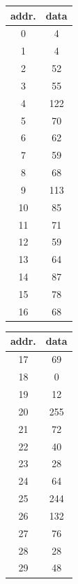 \documentclass{article}
\begin{document}
\begin{figure}[ht]
    \hspace{-10pt}
    \begin{minipage}[c]{.35\linewidth}
        \centering
        \begin{tabular}{c|c}
            addr. & data \\
            \hline \hline
            0     & 4    \\
            1     & 4    \\
            2     & 52   \\
            3     & 55   \\
            4     & 122  \\
            5     & 70   \\
            6     & 62   \\
            7     & 59   \\
            8     & 68   \\
            9     & 113  \\
            10    & 85   \\
            11    & 71   \\
            12    & 59   \\
            13    & 64   \\
            14    & 87   \\
            15    & 78   \\
            16    & 68   \\
        \end{tabular}
        \begin{tabular}{c|c}
            addr. & data \\
            \hline \hline
            17    & 69   \\
            18    & 0    \\
            19    & 12   \\
            20    & 255  \\
            21    & 72   \\
            22    & 40   \\
            23    & 28   \\
            24    & 64   \\
            25    & 244  \\
            26    & 132  \\
            27    & 76   \\
            28    & 28   \\
            29    & 48   \\

\end{tabular}
\end{minipage}
\end{figure}
\end{document}

